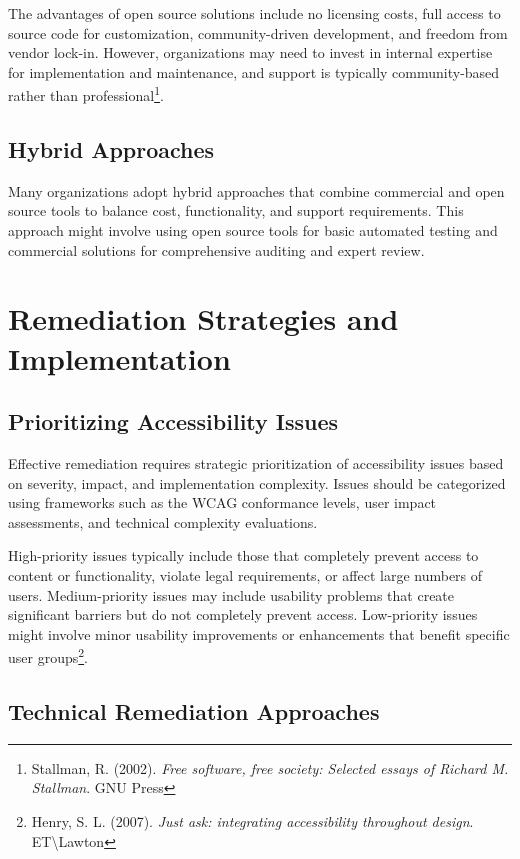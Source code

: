 The advantages of open source solutions include no licensing costs, full access to source code for customization, community-driven development, and freedom from vendor lock-in. However, organizations may need to invest in internal expertise for implementation and maintenance, and support is typically community-based rather than professional\footnote{Stallman, R. (2002). \textit{Free software, free society: Selected essays of Richard M. Stallman}. GNU Press}.

\subsection{Hybrid Approaches}

Many organizations adopt hybrid approaches that combine commercial and open source tools to balance cost, functionality, and support requirements. This approach might involve using open source tools for basic automated testing and commercial solutions for comprehensive auditing and expert review.

\section{Remediation Strategies and Implementation}

\subsection{Prioritizing Accessibility Issues}

Effective remediation requires strategic prioritization of accessibility issues based on severity, impact, and implementation complexity. Issues should be categorized using frameworks such as the WCAG conformance levels, user impact assessments, and technical complexity evaluations.

High-priority issues typically include those that completely prevent access to content or functionality, violate legal requirements, or affect large numbers of users. Medium-priority issues may include usability problems that create significant barriers but do not completely prevent access. Low-priority issues might involve minor usability improvements or enhancements that benefit specific user groups\footnote{Henry, S. L. (2007). \textit{Just ask: integrating accessibility throughout design}. ET\textbackslash Lawton}.

\subsection{Technical Remediation Approaches}


